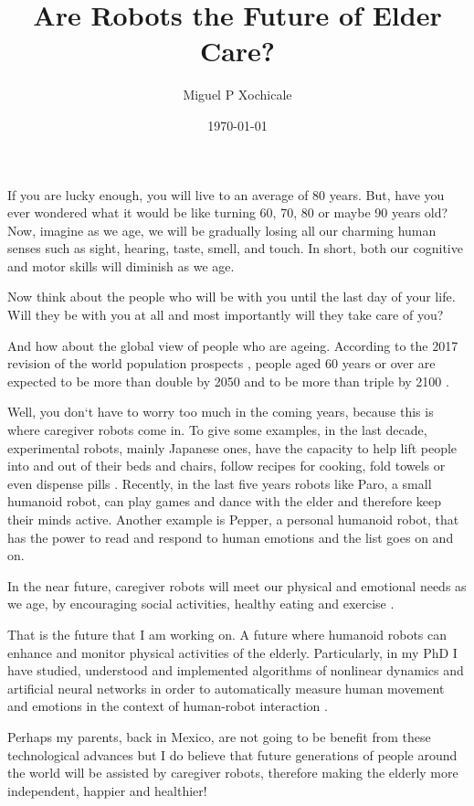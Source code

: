\documentclass[12pt]{article}
\author{Miguel P Xochicale}
\title{ Are Robots the Future of Elder Care?  }
\date{\today}
\begin{document}
\maketitle

If you are lucky enough, you will live to an average of 80 years.
But, have you ever wondered what it would be like turning 60, 70, 80 or maybe 90 years old?
Now, imagine as we age, we will be gradually losing all our
charming human senses such as sight, hearing, taste, smell, and touch.
In short, both our cognitive and motor skills will diminish as we age.

Now think about the people who will be with you until the last day of your life.
Will they be with you at all 
and most importantly will they take care of you?

And how about the global view of people who are ageing.
According to the 2017 revision of the world population prospects \cite{un2017}, 
people aged 60 years or over
are expected to be more than double by 2050 and to be more than triple by 2100 \cite{unb2017}.

Well, you don`t have to worry too much in the coming years, 
because this is where caregiver robots come in.
To give some examples, in the last decade, experimental robots, mainly Japanese ones, 
have the capacity to help lift people into and out of their beds and chairs,
follow recipes for cooking, fold towels or even dispense pills \cite{matuszek2017}.
Recently, in the last five years robots like
Paro, a small humanoid robot, can play games and dance with the elder
and therefore keep their minds active.
Another example is Pepper, a personal humanoid robot, that has the power 
to read and respond to human emotions \cite{hay2015}
and the list goes on and on.

In the near future, caregiver robots will meet our physical and emotional needs as we age, 
by encouraging social activities, healthy eating and exercise \cite{aronson2014}.

That is the future that I am working on.
A future where humanoid robots can enhance and monitor physical activities of the elderly.
Particularly, in my PhD 
I have studied, understood and implemented algorithms of nonlinear dynamics and 
artificial neural networks in order to automatically measure human movement and emotions 
in the context of human-robot interaction \cite{xochicale2018}.

Perhaps my parents, back in Mexico, are not going to be benefit 
from these technological advances 
but I do believe that future generations of people around the world 
will be assisted by caregiver robots,
therefore making the elderly more independent, happier and healthier!
\end{document}
